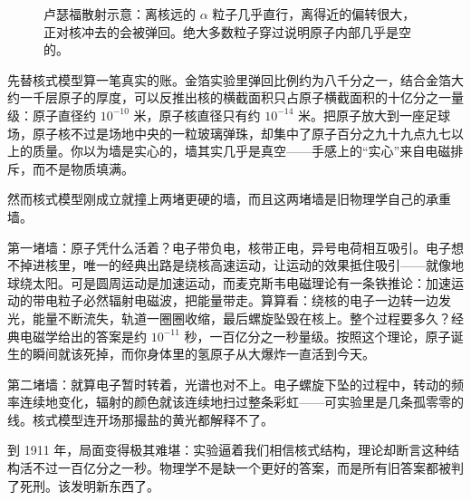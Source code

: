 \begin{figure}[htbp]
\centering
{}
\caption{卢瑟福散射示意：离核远的 \(\alpha\) 粒子几乎直行，离得近的偏转很大，正对核冲去的会被弹回。绝大多数粒子穿过说明原子内部几乎是空的。}
\end{figure}

\begin{mainline}
先替核式模型算一笔真实的账。金箔实验里弹回比例约为八千分之一，结合金箔大约一千层原子的厚度，可以反推出核的横截面积只占原子横截面积的十亿分之一量级：原子直径约 \(10^{-10}\) 米，原子核直径只有约 \(10^{-14}\) 米。把原子放大到一座足球场，原子核不过是场地中央的一粒玻璃弹珠，却集中了原子百分之九十九点九七以上的质量。你以为墙是实心的，墙其实几乎是真空——手感上的“实心”来自电磁排斥，而不是物质填满。

然而核式模型刚成立就撞上两堵更硬的墙，而且这两堵墙是旧物理学自己的承重墙。

第一堵墙：原子凭什么活着？电子带负电，核带正电，异号电荷相互吸引。电子想不掉进核里，唯一的经典出路是绕核高速运动，让运动的效果抵住吸引——就像地球绕太阳。可是圆周运动是加速运动，而麦克斯韦电磁理论有一条铁推论：加速运动的带电粒子必然辐射电磁波，把能量带走。算算看：绕核的电子一边转一边发光，能量不断流失，轨道一圈圈收缩，最后螺旋坠毁在核上。整个过程要多久？经典电磁学给出的答案是约 \(10^{-11}\) 秒，一百亿分之一秒量级。按照这个理论，原子诞生的瞬间就该死掉，而你身体里的氢原子从大爆炸一直活到今天。

第二堵墙：就算电子暂时转着，光谱也对不上。电子螺旋下坠的过程中，转动的频率连续地变化，辐射的颜色就该连续地扫过整条彩虹——可实验里是几条孤零零的线。核式模型连开场那撮盐的黄光都解释不了。

到 1911 年，局面变得极其难堪：实验逼着我们相信核式结构，理论却断言这种结构活不过一百亿分之一秒。物理学不是缺一个更好的答案，而是所有旧答案都被判了死刑。该发明新东西了。
\end{mainline}



